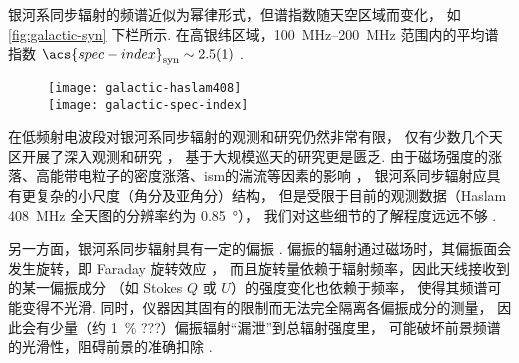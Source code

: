 银河系同步辐射的频谱近似为幂律形式，但谱指数随天空区域而变化，
如\autoref{fig:galactic-syn} 下栏所示.
在高银纬区域，\SIrange{100}{200}{\MHz} 范围内的平均谱指数
$\acs{spec-index}_{\R{syn}} \sim \num{2.5 +- 0.1}$ \cite{rogers2008}.

\begin{figure}[tbp]
  \centering
  \texttt{[image: galactic-haslam408]}
  \\\medskip
  \texttt{[image: galactic-spec-index]}
  \label{fig:galactic-syn}
\end{figure}

在低频射电波段对银河系同步辐射的观测和研究仍然非常有限，
仅有少数几个天区开展了深入观测和研究
\cite{bernardi2009,ghosh2012,iacobelli2013,choudhuri2017}，
基于大规模巡天的研究更是匮乏.
由于磁场强度的涨落、高能带电粒子的密度涨落、\ac{ism}的湍流等因素的影响
\cite{waelkens2009,lazarian2012,iacobelli2013}，
银河系同步辐射应具有更复杂的小尺度（角分及亚角分）结构，
但是受限于目前的观测数据（Haslam \SI{408}{\MHz} 全天图的分辨率约为 \SI{0.85}{\degree}），
我们对这些细节的了解程度远远不够 \cite{ali2016}.

另一方面，银河系同步辐射具有一定的偏振 \cite{bernardi2009,jelic2014,gehlot2018}.
偏振的辐射通过磁场时，其偏振面会发生旋转，即 Faraday 旋转效应 \cite{rybicki1979}，
而且旋转量依赖于辐射频率，因此天线接收到的某一偏振成分
（如 Stokes $Q$ 或 $U$）的强度变化也依赖于频率，
使得其频谱可能变得不光滑.
同时，仪器因其固有的限制而无法完全隔离各偏振成分的测量，
因此会有少量（约 \SI{1}{\percent} ???）偏振辐射\enquote{漏泄}到总辐射强度里，
可能破坏前景频谱的光滑性，阻碍前景的准确扣除
\cite{jelic2010,nunhokee2017,gehlot2018,spinelli2018}.


